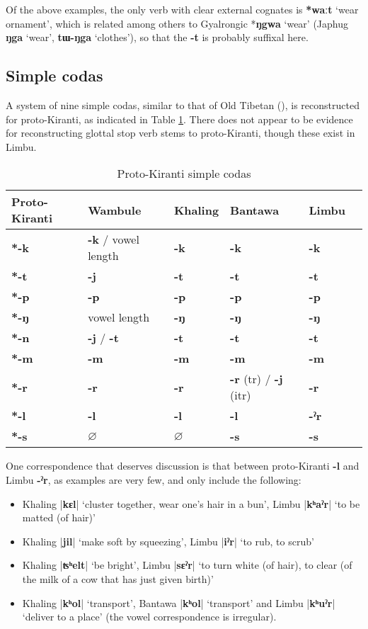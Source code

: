 \documentclass[oldfontcommands,oneside,a4paper,11pt]{article}
\newcommand{\ipa}[1]{\textbf{{\phon\mbox{#1}}}} %
\newcommand{\dhatu}[2]{|\ipa{#1}| `#2'}
\begin{document}
Of the above examples, the only verb with clear external cognates is \ipa{*waːt} `wear ornament', which is related among others to Gyalrongic *\ipa{ŋgwa} `wear' (Japhug \ipa{ŋga} `wear', \ipa{tɯ-ŋga} `clothes'), so that the \ipa{-t} is probably suffixal here. 

\subsection{Simple codas} \label{sec:codas}
A system of nine simple codas, similar to that of Old Tibetan (\citealt{hill10synchronic}), is reconstructed for proto-Kiranti, as indicated in Table \ref{tab:codas}. There does not appear to be evidence for reconstructing glottal stop verb stems to proto-Kiranti, though these exist in Limbu.

\begin{table}[H]
\caption{Proto-Kiranti simple codas} \centering \label{tab:codas}
\begin{tabular}{llllll}
\toprule
Proto-Kiranti & Wambule & Khaling & Bantawa & Limbu \\
\midrule
\ipa{*-k} & \ipa{-k} / vowel length& \ipa{-k} & \ipa{-k} & \ipa{-k}  \\
\ipa{*-t} & \ipa{-j} & \ipa{-t} & \ipa{-t} & \ipa{-t}  \\
\ipa{*-p} & \ipa{-p} & \ipa{-p} & \ipa{-p} & \ipa{-p}  \\
\midrule
\ipa{*-ŋ} & vowel length & \ipa{-ŋ} & \ipa{-ŋ} & \ipa{-ŋ}  \\
\ipa{*-n} & \ipa{-j} /  \ipa{-t} & \ipa{-t} & \ipa{-t} & \ipa{-t}  \\
\ipa{*-m} & \ipa{-m} & \ipa{-m} & \ipa{-m} & \ipa{-m}  \\
\midrule
\ipa{*-r} &  \ipa{-r}  & \ipa{-r} & \ipa{-r} (tr) / \ipa{-j} (itr) & \ipa{-r}  \\
\ipa{*-l} & \ipa{-l}  & \ipa{-l} & \ipa{-l} & \ipa{-ˀr}  \\
\ipa{*-s} &$\varnothing$ & $\varnothing$ & \ipa{-s} & \ipa{-s}  \\
\bottomrule
\end{tabular}
\end{table}

One correspondence that deserves discussion is that between proto-Kiranti \ipa{-l} and Limbu \ipa{-ˀr}, as examples are very few, and only include the following:

\begin{itemize}
\item  Khaling \dhatu{kɛl}{cluster together, wear one's hair in a bun}, Limbu \dhatu{kʰaˀr}{to be matted (of hair)}  			 
\item  Khaling \dhatu{jil}{make soft by squeezing}, Limbu \dhatu{iˀr}{to rub, to scrub}  		 
\item   Khaling \dhatu{ʦʰelt}{be bright}, Limbu \dhatu{sɛˀr}{to turn white (of hair), to clear (of the milk of a cow that has just given birth)}  
\item Khaling \dhatu{kʰol}{transport}, Bantawa	  \dhatu{kʰol}{transport}	 and	 Limbu \dhatu{kʰuˀr}{deliver to a place}	  (the vowel correspondence is irregular).
\end{itemize}
\end{document}
